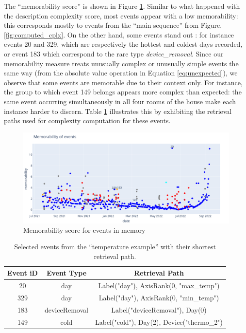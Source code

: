 \documentclass[entropy,article,submit,moreauthors,pdftex]{Definitions/mdpi}
\begin{document}
The ``memorability score'' is shown in Figure \ref{fig:result1}. Similar to what happened with the description complexity score, most events appear with a low memorability: this corresponds mostly to events from the ``main sequence'' from Figure. \ref{fig:computed_cplx}. On the other hand, some events stand out : for instance events 20 and 329, which are respectively the hottest and coldest days recorded, or event 183 which correspond to the rare type \emph{device\_removal}.
Since our memorability measure treats unusually complex or unusually simple events the
same way (from the absolute value operation in Equation \ref{eq:unexpected}), we
observe that some events are memorable due to their context only. For instance,
the group to which event 149 belongs appears more complex than expected: the same event occurring simultaneously in all four rooms of the house make each instance harder to discern.
Table \ref{tab:paths} illustrates this by exhibiting the retrieval paths used for complexity computation for these events.

\begin{figure}[ht]
    \centering
    \includegraphics[width=.8\linewidth]{figures/memo_scenar_2.png}
    \caption{Memorability score for events in memory}
    \label{fig:result1}
\end{figure}

\begin{table}
    \centering
    \begin{tabular}{c|c|c}
        Event iD & Event Type    & Retrieval Path                             \\
        \hline
        20       & day           & Label("day"), AxisRank(0, "max\_temp")     \\
        329      & day           & Label("day"), AxisRank(0, "min\_temp")     \\
        183      & deviceRemoval & Label("deviceRemoval"), Day(0)             \\
        149      & cold          & Label("cold"), Day(2), Device("thermo\_2") \\
    \end{tabular}
    \caption{Selected events from the ``temperature example'' with their shortest retrieval path.}
    \label{tab:paths}
\end{table}
\end{document}
